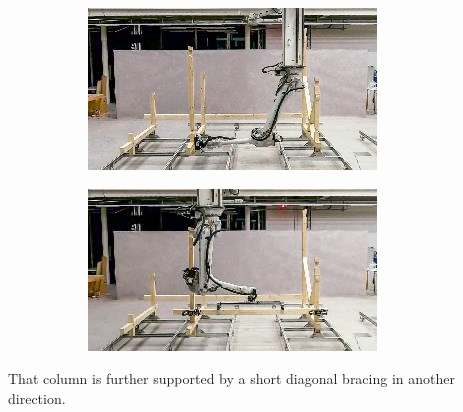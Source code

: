 \documentclass[11pt]{book}
\begin{document}
{\small \begin{figure}[H]
\centering
\begin{subfigure}[b]{0.45\textwidth}
\centering
\includegraphics[width=\textwidth]{./images/image67.jpeg}
\end{subfigure}
\hfill
\begin{subfigure}[b]{0.45\textwidth}
\centering
\includegraphics[width=\textwidth]{./images/image68.jpeg}
\end{subfigure}
\end{figure}
}

That column is further supported by a short diagonal bracing in another direction.
\end{document}
